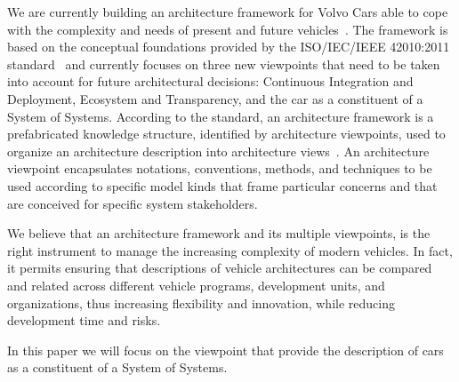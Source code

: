 We are currently building an architecture framework for Volvo Cars able to cope with the complexity and needs of present and future vehicles~\cite{JSA2017}.  The framework is based on the conceptual foundations provided by the ISO/IEC/IEEE 42010:2011
standard~\cite{42010} and currently focuses on three new viewpoints that need to be taken
into account for future architectural decisions: Continuous Integration and Deployment,
Ecosystem and Transparency, and the car as a constituent of a System of Systems.
According to the standard, an architecture framework is a prefabricated knowledge structure, identified by architecture viewpoints, used to organize an architecture
description into architecture views~\cite{42010}. An architecture viewpoint encapsulates notations, conventions, methods, and techniques to be used according to specific model kinds that frame particular concerns and that are conceived for specific system
stakeholders. 

We believe that an architecture framework and its multiple viewpoints, is the right instrument to manage the increasing complexity of modern vehicles. In fact, it permits ensuring that descriptions of vehicle architectures can be compared and related across different vehicle programs, development units, and organizations, thus increasing flexibility and innovation, while reducing development time and risks. 

In this paper we will focus on the viewpoint that provide the description of cars as a constituent of a System of Systems.
